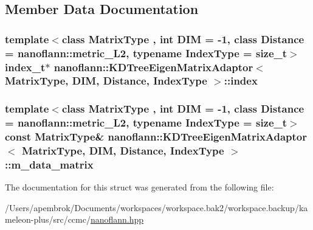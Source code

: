 \subsection{Member Data Documentation}
\hypertarget{structnanoflann_1_1_k_d_tree_eigen_matrix_adaptor_a171c13d72cca6020775ae1d15ea2f935}{
\subsubsection[{index}]{\setlength{\rightskip}{0pt plus 5cm}template$<$class Matrix\-Type , int D\-I\-M = -\/1, class Distance  = nanoflann\-::metric\-\_\-\-L2, typename Index\-Type  = size\-\_\-t$>$ {\bf index\-\_\-t}$\ast$ {\bf nanoflann\-::\-K\-D\-Tree\-Eigen\-Matrix\-Adaptor}$<$ Matrix\-Type, D\-I\-M, Distance, Index\-Type $>$\-::index}}\label{structnanoflann_1_1_k_d_tree_eigen_matrix_adaptor_a171c13d72cca6020775ae1d15ea2f935}
\hypertarget{structnanoflann_1_1_k_d_tree_eigen_matrix_adaptor_a003a066551cff2038b11efc66633d0f8}{
\subsubsection[{m\-\_\-data\-\_\-matrix}]{\setlength{\rightskip}{0pt plus 5cm}template$<$class Matrix\-Type , int D\-I\-M = -\/1, class Distance  = nanoflann\-::metric\-\_\-\-L2, typename Index\-Type  = size\-\_\-t$>$ const Matrix\-Type\& {\bf nanoflann\-::\-K\-D\-Tree\-Eigen\-Matrix\-Adaptor}$<$ Matrix\-Type, D\-I\-M, Distance, Index\-Type $>$\-::m\-\_\-data\-\_\-matrix}}\label{structnanoflann_1_1_k_d_tree_eigen_matrix_adaptor_a003a066551cff2038b11efc66633d0f8}


The documentation for this struct was generated from the following file\-:\begin{DoxyCompactItemize}
\item 
/\-Users/apembrok/\-Documents/workspaces/workspace.\-bak2/workspace.\-backup/kameleon-\/plus/src/ccmc/\hyperlink{nanoflann_8hpp}{nanoflann.\-hpp}\end{DoxyCompactItemize}
